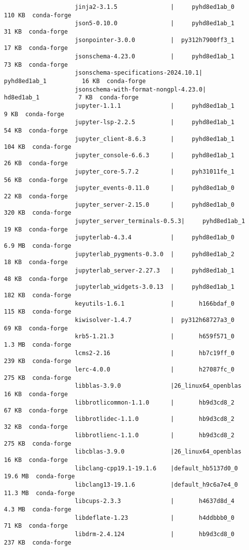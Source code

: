 \documentclass{article}
\begin{document}
\begin{enumerate}
\begin{itemize}
\begin{itemize}
\begin{itemize}
\begin{verbatim}
					jinja2-3.1.5               |     pyhd8ed1ab_0         110 KB  conda-forge
					json5-0.10.0               |     pyhd8ed1ab_1          31 KB  conda-forge
					jsonpointer-3.0.0          |  py312h7900ff3_1          17 KB  conda-forge
					jsonschema-4.23.0          |     pyhd8ed1ab_1          73 KB  conda-forge
					jsonschema-specifications-2024.10.1|     pyhd8ed1ab_1          16 KB  conda-forge
					jsonschema-with-format-nongpl-4.23.0|       hd8ed1ab_1           7 KB  conda-forge
					jupyter-1.1.1              |     pyhd8ed1ab_1           9 KB  conda-forge
					jupyter-lsp-2.2.5          |     pyhd8ed1ab_1          54 KB  conda-forge
					jupyter_client-8.6.3       |     pyhd8ed1ab_1         104 KB  conda-forge
					jupyter_console-6.6.3      |     pyhd8ed1ab_1          26 KB  conda-forge
					jupyter_core-5.7.2         |     pyh31011fe_1          56 KB  conda-forge
					jupyter_events-0.11.0      |     pyhd8ed1ab_0          22 KB  conda-forge
					jupyter_server-2.15.0      |     pyhd8ed1ab_0         320 KB  conda-forge
					jupyter_server_terminals-0.5.3|     pyhd8ed1ab_1          19 KB  conda-forge
					jupyterlab-4.3.4           |     pyhd8ed1ab_0         6.9 MB  conda-forge
					jupyterlab_pygments-0.3.0  |     pyhd8ed1ab_2          18 KB  conda-forge
					jupyterlab_server-2.27.3   |     pyhd8ed1ab_1          48 KB  conda-forge
					jupyterlab_widgets-3.0.13  |     pyhd8ed1ab_1         182 KB  conda-forge
					keyutils-1.6.1             |       h166bdaf_0         115 KB  conda-forge
					kiwisolver-1.4.7           |  py312h68727a3_0          69 KB  conda-forge
					krb5-1.21.3                |       h659f571_0         1.3 MB  conda-forge
					lcms2-2.16                 |       hb7c19ff_0         239 KB  conda-forge
					lerc-4.0.0                 |       h27087fc_0         275 KB  conda-forge
					libblas-3.9.0              |26_linux64_openblas          16 KB  conda-forge
					libbrotlicommon-1.1.0      |       hb9d3cd8_2          67 KB  conda-forge
					libbrotlidec-1.1.0         |       hb9d3cd8_2          32 KB  conda-forge
					libbrotlienc-1.1.0         |       hb9d3cd8_2         275 KB  conda-forge
					libcblas-3.9.0             |26_linux64_openblas          16 KB  conda-forge
					libclang-cpp19.1-19.1.6    |default_hb5137d0_0        19.6 MB  conda-forge
					libclang13-19.1.6          |default_h9c6a7e4_0        11.3 MB  conda-forge
					libcups-2.3.3              |       h4637d8d_4         4.3 MB  conda-forge
					libdeflate-1.23            |       h4ddbbb0_0          71 KB  conda-forge
					libdrm-2.4.124             |       hb9d3cd8_0         237 KB  conda-forge

\end{verbatim}
\end{itemize}
\end{itemize}
\end{itemize}
\end{enumerate}
\end{document}
